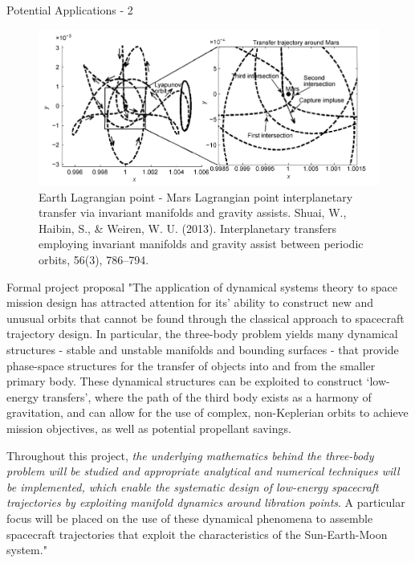 \documentclass[10pt]{beamer}
\begin{document}
\begin{frame}{Potential Applications - 2}
	\begin{figure}
		\centering
		\includegraphics[height=.4\textheight]{interplanetary}
		\caption{Earth Lagrangian point - Mars Lagrangian point interplanetary transfer via invariant manifolds and gravity assists. Shuai, W., Haibin, S., \& Weiren, W. U. (2013). Interplanetary transfers employing invariant manifolds and gravity assist between periodic orbits, 56(3), 786–794.}
	\end{figure}
\end{frame}



\begin{frame}{Formal project proposal}
	\small "The application of dynamical systems theory to space mission design has attracted attention for its' ability to construct new and unusual orbits that cannot be found through the classical approach to spacecraft trajectory design. In particular, the three-body problem yields many dynamical structures - stable and unstable manifolds and bounding surfaces - that provide phase-space structures for the transfer of objects into and from the smaller primary body. These dynamical structures can be exploited to construct `low-energy transfers', where the path of the third body exists as a harmony of gravitation, and can allow for the use of complex, non-Keplerian orbits to achieve mission objectives, as well as potential propellant savings.

	Throughout this project, \emph{the underlying mathematics behind the three-body problem will be studied and appropriate analytical and numerical techniques will be implemented, which enable the systematic design of low-energy spacecraft trajectories by exploiting manifold dynamics around libration points}. A particular focus will be placed on the use of these dynamical phenomena to assemble spacecraft trajectories that exploit the characteristics of the Sun-Earth-Moon system."
\end{frame}
\end{document}
